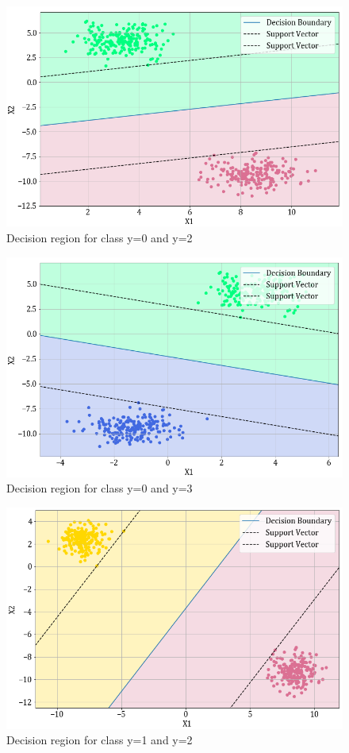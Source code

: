 \documentclass[11pt,a4paper]{article}
\begin{document}
\begin{figure}[H]
    \centering
    \includegraphics[scale=0.55]{images/1A_ovo_02.png}
    \caption{Decision region for class y=0 and y=2}
\end{figure}

\begin{figure}[H]
    \centering
    \includegraphics[scale=0.55]{images/1A_ovo_03.png}
    \caption{Decision region for class y=0 and y=3}
\end{figure}

\begin{figure}[H]
    \centering
    \includegraphics[scale=0.55]{images/1A_ovo_12.png}
    \caption{Decision region for class y=1 and y=2}
\end{figure}
\end{document}
